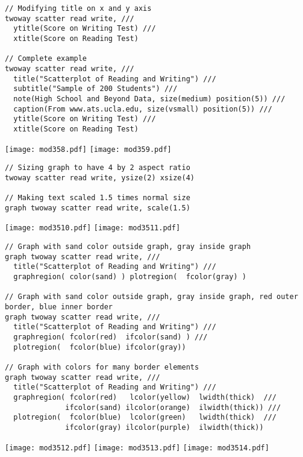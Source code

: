 \begin{lstlisting}
// Modifying title on x and y axis
twoway scatter read write, ///
  ytitle(Score on Writing Test) ///
  xtitle(Score on Reading Test)

// Complete example
twoway scatter read write, ///
  title("Scatterplot of Reading and Writing") ///
  subtitle("Sample of 200 Students") ///
  note(High School and Beyond Data, size(medium) position(5)) ///
  caption(From www.ats.ucla.edu, size(vsmall) position(5)) ///
  ytitle(Score on Writing Test) ///
  xtitle(Score on Reading Test)
\end{lstlisting}
\begin{center}
\texttt{[image: mod358.pdf]}
\texttt{[image: mod359.pdf]}
\end{center}

\begin{lstlisting}
// Sizing graph to have 4 by 2 aspect ratio
twoway scatter read write, ysize(2) xsize(4)

// Making text scaled 1.5 times normal size
graph twoway scatter read write, scale(1.5)
\end{lstlisting}

\begin{center}
\texttt{[image: mod3510.pdf]}
\texttt{[image: mod3511.pdf]}
\end{center}

\begin{lstlisting}
// Graph with sand color outside graph, gray inside graph
graph twoway scatter read write, ///
  title("Scatterplot of Reading and Writing") ///
  graphregion( color(sand) ) plotregion(  fcolor(gray) )

// Graph with sand color outside graph, gray inside graph, red outer border, blue inner border
graph twoway scatter read write, ///
  title("Scatterplot of Reading and Writing") ///
  graphregion( fcolor(red)  ifcolor(sand) ) ///
  plotregion(  fcolor(blue) ifcolor(gray))

// Graph with colors for many border elements
graph twoway scatter read write, ///
  title("Scatterplot of Reading and Writing") ///
  graphregion( fcolor(red)   lcolor(yellow)  lwidth(thick)  ///
              ifcolor(sand) ilcolor(orange)  ilwidth(thick)) ///
  plotregion(  fcolor(blue)  lcolor(green)   lwidth(thick)  ///
              ifcolor(gray) ilcolor(purple)  ilwidth(thick))
\end{lstlisting}

\begin{center}
\texttt{[image: mod3512.pdf]}
\texttt{[image: mod3513.pdf]}
\texttt{[image: mod3514.pdf]}
\end{center}
